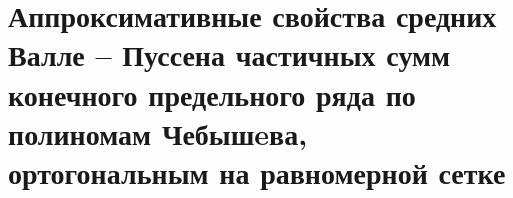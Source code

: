 
\chapter{Аппроксимативные свойства средних Валле -- Пуссена частичных сумм
конечного предельного ряда по полиномам Чебышeва, ортогональным на равномерной сетке}



